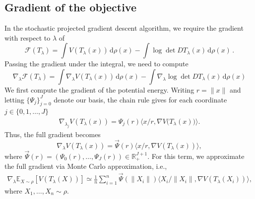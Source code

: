 \documentclass[twoside]{article}
\newcommand{\cF}{\mathcal{F}}
\newcommand{\1}{\mathds{1}}
\newcommand{\R}{\mathbb{R}}
\newcommand*{\E}{\mathbb E}
\newcommand*{\rd}{\mathrm{d}}
\newcommand*{\dd}{\, \rd}
\theoremstyle{plain}
\theoremstyle{definition}
\theoremstyle{remark}
\begin{document}
\subsection{Gradient of the objective}\label{app:grad_objective}
In the stochastic projected gradient descent algorithm, we require the gradient with respect to $\lambda$ of
\[
\cF(T_\lambda)
=\int V(T_\lambda(x))\,\mathrm{d}\rho(x)
-\int \log\det DT_\lambda(x)\dd\rho(x)\,.
\]
Passing the gradient under the integral, we need to compute
\begin{equation}\label{eq:grad_kl}
    \nabla_{\lambda}\cF(T_\lambda)
    = \int \nabla_{\lambda} V(T_\lambda(x)) \dd \rho(x) - \int \nabla_{\lambda}\log\det DT_\lambda(x) \dd \rho(x)
\end{equation}
We first compute the gradient of the potential energy. Writing $r=\|x\|$ and letting $\{\Psi_j\}_{j=0}^J$ denote our basis, the chain rule gives for each coordinate $j\in\{0,1,\ldots,J\}$
\begin{align*}
\nabla_{\lambda_j} V(T_\lambda(x))
= \Psi_j(r) \langle x/r, \nabla V\big(T_\lambda(x)\big)\rangle.
\end{align*}
Thus, the full gradient becomes
\begin{equation}\label{eq:grad_norm_v}
\nabla_{\lambda} V(T_\lambda(x))
= \vec\Psi(r)\langle x/r, \nabla V(T_\lambda(x))\rangle ,
\end{equation}
where $\vec\Psi(r) = (\Psi_0(r),\ldots,\Psi_J(r)) \in \R^{J+1}_{+}$. For this term, we approximate the full gradient via Monte Carlo approximation, i.e.,
\begin{align*}
\nabla_\lambda \E_{X\sim\rho}[V(T_\lambda(X))] \simeq \frac{1}{n}\sum_{i=1}^n \vec\Psi(\|X_i\|)\langle X_i/\|X_i\|, \nabla V(T_\lambda(X_i))\rangle ,
\end{align*}
where $X_1,\ldots,X_n \sim \rho$.
\end{document}
